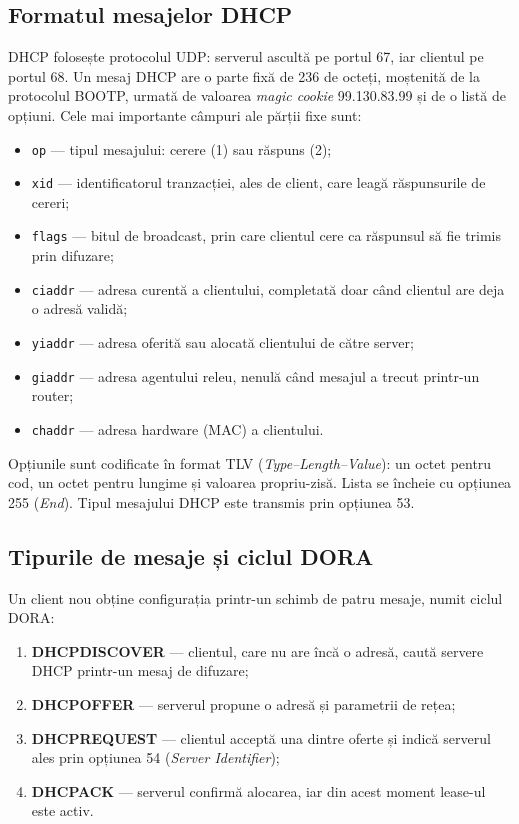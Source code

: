 \documentclass[conference]{IEEEtran}
\begin{document}
\subsection{Formatul mesajelor DHCP}
DHCP folosește protocolul UDP: serverul ascultă pe portul 67, iar clientul pe portul 68. Un mesaj DHCP are o parte fixă de 236 de octeți, moștenită de la protocolul BOOTP, urmată de valoarea \textit{magic cookie} 99.130.83.99 și de o listă de opțiuni. Cele mai importante câmpuri ale părții fixe sunt:
\begin{itemize}
\item \texttt{op} --- tipul mesajului: cerere (1) sau răspuns (2);
\item \texttt{xid} --- identificatorul tranzacției, ales de client, care leagă răspunsurile de cereri;
\item \texttt{flags} --- bitul de broadcast, prin care clientul cere ca răspunsul să fie trimis prin difuzare;
\item \texttt{ciaddr} --- adresa curentă a clientului, completată doar când clientul are deja o adresă validă;
\item \texttt{yiaddr} --- adresa oferită sau alocată clientului de către server;
\item \texttt{giaddr} --- adresa agentului releu, nenulă când mesajul a trecut printr-un router;
\item \texttt{chaddr} --- adresa hardware (MAC) a clientului.
\end{itemize}

Opțiunile sunt codificate în format TLV (\textit{Type--Length--Value}): un octet pentru cod, un octet pentru lungime și valoarea propriu-zisă. Lista se încheie cu opțiunea 255 (\textit{End}). Tipul mesajului DHCP este transmis prin opțiunea 53.

\subsection{Tipurile de mesaje și ciclul DORA}
Un client nou obține configurația printr-un schimb de patru mesaje, numit ciclul DORA:
\begin{enumerate}
\item \textbf{DHCPDISCOVER} --- clientul, care nu are încă o adresă, caută servere DHCP printr-un mesaj de difuzare;
\item \textbf{DHCPOFFER} --- serverul propune o adresă și parametrii de rețea;
\item \textbf{DHCPREQUEST} --- clientul acceptă una dintre oferte și indică serverul ales prin opțiunea 54 (\textit{Server Identifier});
\item \textbf{DHCPACK} --- serverul confirmă alocarea, iar din acest moment lease-ul este activ.
\end{enumerate}
\end{document}
